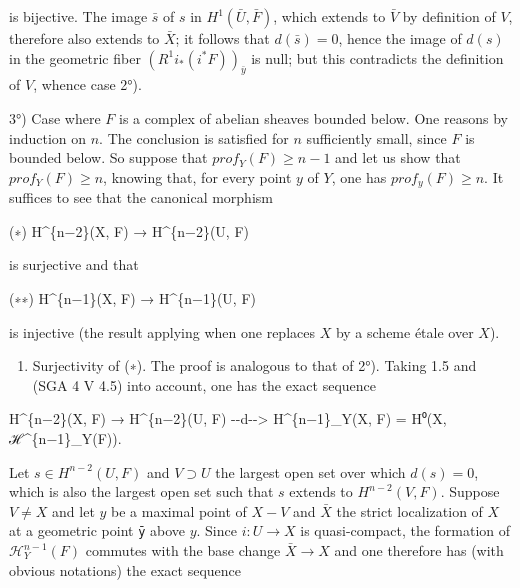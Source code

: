 \documentclass[
]{article}
\newenvironment{Shaded}{}{}
\newcommand{\NormalTok}[1]{#1}
\providecommand{\tightlist}{%
  \setlength{\itemsep}{0pt}\setlength{\parskip}{0pt}}
\begin{document}
is bijective. The image \(\bar{s}\) of \(s\) in
\(H^{1}(\bar{U}, \bar{F})\), which extends to \(\bar{V}\) by definition
of \(V\), therefore also extends to \(\bar{X}\); it follows that
\(d(\bar{s}) = 0\), hence the image of \(d(s)\) in the geometric fiber
\((R^{1} i_{*} (i^{*} F))_{\bar{y}}\) is null; but this contradicts the
definition of \(V\), whence case 2°).

3°) Case where \(F\) is a complex of abelian sheaves bounded below. One
reasons by induction on \(n\). The conclusion is satisfied for \(n\)
sufficiently small, since \(F\) is bounded below. So suppose that
\(prof_{Y}(F) \geqslant n - 1\) and let us show that
\(prof_{Y}(F) \geqslant n\), knowing that, for every point \(y\) of
\(Y\), one has \(prof_{y}(F) \geqslant n\). It suffices to see that the
canonical morphism

\begin{Shaded}
\begin{Highlighting}[]
\NormalTok{(∗)    H\^{}\{n−2\}(X, F) → H\^{}\{n−2\}(U, F)}
\end{Highlighting}
\end{Shaded}

is surjective and that

\begin{Shaded}
\begin{Highlighting}[]
\NormalTok{(∗∗)   H\^{}\{n−1\}(X, F) → H\^{}\{n−1\}(U, F)}
\end{Highlighting}
\end{Shaded}

is injective (the result applying when one replaces \(X\) by a scheme
étale over \(X\)).

\begin{enumerate}
\def\labelenumi{\alph{enumi})}
\tightlist
\item
  Surjectivity of (∗). The proof is analogous to that of 2°). Taking 1.5
  and (SGA 4 V 4.5) into account, one has the exact sequence
\end{enumerate}

\begin{Shaded}
\begin{Highlighting}[]
\NormalTok{H\^{}\{n−2\}(X, F) → H\^{}\{n−2\}(U, F) {-}{-}d{-}{-}\textgreater{} H\^{}\{n−1\}\_Y(X, F) = H⁰(X, ℋ\^{}\{n−1\}\_Y(F)).}
\end{Highlighting}
\end{Shaded}

Let \(s \in H^{n-2}(U, F)\) and \(V \supset U\) the largest open set
over which \(d(s) = 0\), which is also the largest open set such that
\(s\) extends to \(H^{n-2}(V, F)\). Suppose \(V \neq X\) and let \(y\)
be a maximal point of \(X - V\) and \(\bar{X}\) the strict localization
of \(X\) at a geometric point \texttt{ȳ} above \(y\). Since
\(i : U \to X\) is quasi-compact, the formation of
\(\mathcal{H}^{n-1}_{Y}(F)\) commutes with the base change
\(\bar{X} \to X\) and one therefore has (with obvious notations) the
exact sequence
\end{document}
